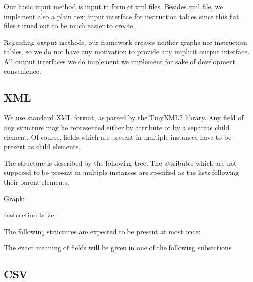 \label{sec:formats}

Our basic input method is input in form of xml files. Besides xml file, we implement also a plain text input interface for instruction tables since this flat files turned out to be much easier to create. 

Regarding output methods, our framework creates neither graphs nor instruction tables, so we do not have any motivation to provide any implicit output interface. All output interfaces we do implement we implement for sake of development convenience.

\subsection{XML}

We use standard XML format, as parsed by the TinyXML2 library. Any field of any structure may be represented either by attribute or by a separate child element. Of course, fields which are present in multiple instances have to be present as child elements.

The structure is described by the following tree. The attributes which are not supposed to be present in multiple instances are specified as the lists following their parent elements.


Graph:

\pagebreak

Instruction table:

The following structures are expected to be present at most once: \\ \centerline{}

The exact meaning of fields will be given in one of the following subsections.

\subsection{CSV}

